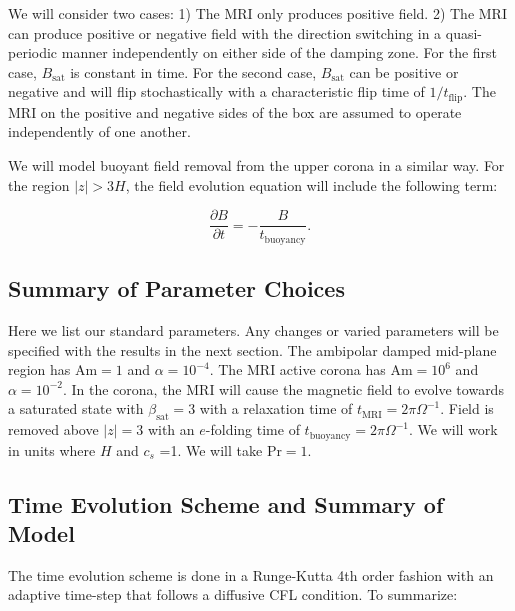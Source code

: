 We will consider two cases: 1) The MRI only produces positive field.  2) The MRI can produce positive or negative field with the direction switching in a quasi-periodic manner independently on either side of the damping zone.  For the first case, $B_{\text{sat}}$ is constant in time.  For the second case, $B_{\text{sat}}$ can be positive or negative and will flip stochastically with a characteristic flip time of $1/t_{\text{flip}}$.  The MRI on the positive and negative sides of the box are assumed to operate independently of one another.  

We will model buoyant field removal from the upper corona in a similar way.  For the region $|z|>3H$, the field evolution equation will include the following term:

\begin{equation}
\frac{\partial B}{\partial t} = -\frac{B}{t_\text{buoyancy}}.
\end{equation}


\subsection{Summary of Parameter Choices}
Here we list our standard parameters.  Any changes or varied parameters will be specified with the results in the next section.  The ambipolar damped mid-plane region has $\text{Am}=1$ and $\alpha=10^{-4}$.  The MRI active corona has $\text{Am}=10^6$ and $\alpha=10^{-2}$.  In the corona, the MRI will cause the magnetic field to evolve towards a saturated state with $\beta_{\text{sat}}=3$ with a relaxation time of $t_\text{MRI}=2\pi \Omega^{-1}$.  Field is removed above $|z|=3$ with an $e$-folding time of $t_\text{buoyancy}=2\pi \Omega^{-1}$.  We will work in units where $H$ and $c_s$ =1.  We will take $\text{Pr}=1$.  


\subsection{Time Evolution Scheme and Summary of Model}
The time evolution scheme is done in a Runge-Kutta 4th order fashion with an adaptive time-step that follows a diffusive CFL condition.  To summarize:


